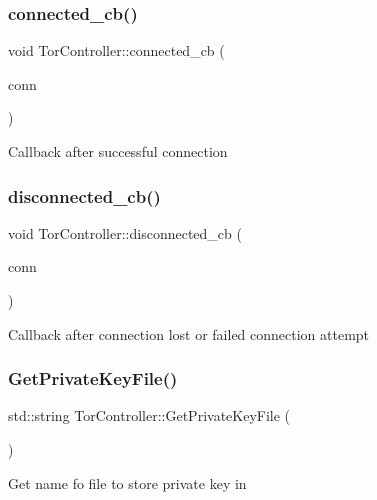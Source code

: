 \subsubsection{\texorpdfstring{connected\+\_\+cb()}{connected\_cb()}}
{\footnotesize\ttfamily void Tor\+Controller\+::connected\+\_\+cb (\begin{DoxyParamCaption}\item[{\mbox{\hyperlink{class_tor_control_connection}{Tor\+Control\+Connection}} \&}]{conn }\end{DoxyParamCaption})\hspace{0.3cm}{\ttfamily [private]}}

Callback after successful connection \mbox{\label{class_tor_controller_a81392f33f0c7e069762668ec3a757075}} 
\subsubsection{\texorpdfstring{disconnected\+\_\+cb()}{disconnected\_cb()}}
{\footnotesize\ttfamily void Tor\+Controller\+::disconnected\+\_\+cb (\begin{DoxyParamCaption}\item[{\mbox{\hyperlink{class_tor_control_connection}{Tor\+Control\+Connection}} \&}]{conn }\end{DoxyParamCaption})\hspace{0.3cm}{\ttfamily [private]}}

Callback after connection lost or failed connection attempt \mbox{\label{class_tor_controller_a524481ece961670f745dbbfb4d9d5a33}} 
\subsubsection{\texorpdfstring{Get\+Private\+Key\+File()}{GetPrivateKeyFile()}}
{\footnotesize\ttfamily std\+::string Tor\+Controller\+::\+Get\+Private\+Key\+File (\begin{DoxyParamCaption}{ }\end{DoxyParamCaption})}

Get name fo file to store private key in \mbox{\label{class_tor_controller_aee36fcd1cd60d7f4eb007d909894b1c3}} 
